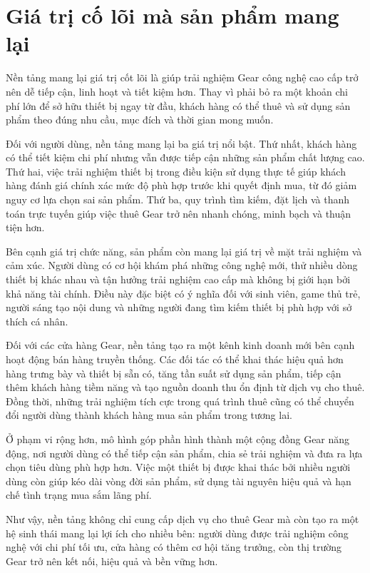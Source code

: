 \section{Giá trị cố lõi mà sản phẩm mang lại}
    Nền tảng mang lại giá trị cốt lõi là giúp trải nghiệm Gear công nghệ cao cấp trở nên dễ tiếp cận, linh hoạt và tiết kiệm hơn. Thay vì phải bỏ ra một khoản chi phí lớn để sở hữu thiết bị ngay từ đầu, khách hàng có thể thuê và sử dụng sản phẩm theo đúng nhu cầu, mục đích và thời gian mong muốn.

    Đối với người dùng, nền tảng mang lại ba giá trị nổi bật. Thứ nhất, khách hàng có thể tiết kiệm chi phí nhưng vẫn được tiếp cận những sản phẩm chất lượng cao. Thứ hai, việc trải nghiệm thiết bị trong điều kiện sử dụng thực tế giúp khách hàng đánh giá chính xác mức độ phù hợp trước khi quyết định mua, từ đó giảm nguy cơ lựa chọn sai sản phẩm. Thứ ba, quy trình tìm kiếm, đặt lịch và thanh toán trực tuyến giúp việc thuê Gear trở nên nhanh chóng, minh bạch và thuận tiện hơn.

    Bên cạnh giá trị chức năng, sản phẩm còn mang lại giá trị về mặt trải nghiệm và cảm xúc. Người dùng có cơ hội khám phá những công nghệ mới, thử nhiều dòng thiết bị khác nhau và tận hưởng trải nghiệm cao cấp mà không bị giới hạn bởi khả năng tài chính. Điều này đặc biệt có ý nghĩa đối với sinh viên, game thủ trẻ, người sáng tạo nội dung và những người đang tìm kiếm thiết bị phù hợp với sở thích cá nhân.

    Đối với các cửa hàng Gear, nền tảng tạo ra một kênh kinh doanh mới bên cạnh hoạt động bán hàng truyền thống. Các đối tác có thể khai thác hiệu quả hơn hàng trưng bày và thiết bị sẵn có, tăng tần suất sử dụng sản phẩm, tiếp cận thêm khách hàng tiềm năng và tạo nguồn doanh thu ổn định từ dịch vụ cho thuê. Đồng thời, những trải nghiệm tích cực trong quá trình thuê cũng có thể chuyển đổi người dùng thành khách hàng mua sản phẩm trong tương lai.

    Ở phạm vi rộng hơn, mô hình góp phần hình thành một cộng đồng Gear năng động, nơi người dùng có thể tiếp cận sản phẩm, chia sẻ trải nghiệm và đưa ra lựa chọn tiêu dùng phù hợp hơn. Việc một thiết bị được khai thác bởi nhiều người dùng còn giúp kéo dài vòng đời sản phẩm, sử dụng tài nguyên hiệu quả và hạn chế tình trạng mua sắm lãng phí.

    Như vậy, nền tảng không chỉ cung cấp dịch vụ cho thuê Gear mà còn tạo ra một hệ sinh thái mang lại lợi ích cho nhiều bên: người dùng được trải nghiệm công nghệ với chi phí tối ưu, cửa hàng có thêm cơ hội tăng trưởng, còn thị trường Gear trở nên kết nối, hiệu quả và bền vững hơn.